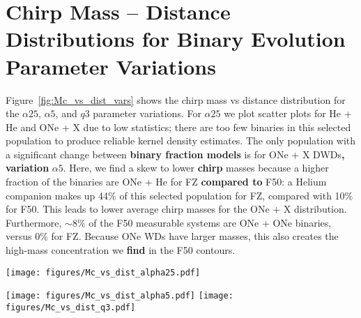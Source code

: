 \documentclass[twocolumn, linenumbers]{aastex631}
\begin{document}
\section{Chirp Mass -- Distance Distributions for Binary Evolution 
Parameter Variations}\label{appendix:Mc_dist_vars}

Figure~\ref{fig:Mc_vs_dist_vars} shows the chirp mass vs distance 
distribution for the $\alpha25$, $\alpha5$, and $q3$ parameter variations. 
For $\alpha25$ we plot scatter plots for He + He and ONe + X due to low 
statistics; there are too few binaries in this selected population to 
produce reliable kernel density estimates. The only population with a 
significant change between \textbf{binary fraction models} is for ONe + X 
DWDs\textbf{, variation} $\alpha5$. Here, we find a skew to lower 
\textbf{chirp} masses because a higher fraction of the binaries are ONe + 
He for FZ \textbf{compared to} F50: a Helium companion makes up 44\% of 
this selected population for FZ, compared with 10\% for F50. This leads to 
lower average chirp masses for the ONe + X distribution. Furthermore, 
$\sim8$\% of the F50 measurable systems are ONe + ONe binaries, versus 0\% 
for FZ. Because ONe WDs have larger masses, this also creates the 
high-mass concentration we \textbf{find} in the F50 contours.
\begin{figure*}[h]
    \centering
	
\texttt{[image: figures/Mc\_vs\_dist\_alpha25.pdf]}
	
\texttt{[image: figures/Mc\_vs\_dist\_alpha5.pdf]}
	\texttt{[image: figures/Mc\_vs\_dist\_q3.pdf]}
    \caption{Chirp mass -- distance distributions for our other three 
binary evolution parameter variations. We plot the $\alpha25$ populations 
of He + He and ONe + X DWDs as scatter points since there are too few 
binaries to produce meaningful density distributions. Again, we have 
plotted each DWD type's population that exhibit observable GW frequency 
evolution and have $\rm{SNR}>7$. Contours show the 5$^{\rm{th}}$, 
25$^{\rm{th}}$, 50$^{\rm{th}}$, 75$^{\rm{th}}$ and 95$^{\rm{th}}$ 
percentiles. Most populations remain unchanged between binary fraction 
models except for ONe + X DWDs in $\alpha5$, due to the number of He vs. 
CO vs. ONe companions between each model.}
    \label{fig:Mc_vs_dist_vars}
\end{figure*}
\end{document}
